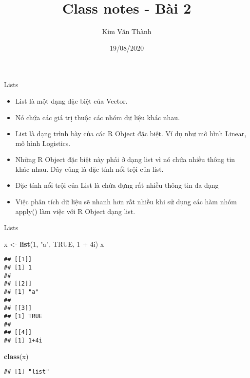 \documentclass[
  ignorenonframetext,
]{beamer}
\title{Class notes - Bài 2}
\author{Kim Văn Thành}
\date{19/08/2020}
\newenvironment{Shaded}{}{}
\newcommand{\DecValTok}[1]{\textcolor[rgb]{0.25,0.63,0.44}{#1}}
\newcommand{\KeywordTok}[1]{\textcolor[rgb]{0.00,0.44,0.13}{\textbf{#1}}}
\newcommand{\NormalTok}[1]{#1}
\newcommand{\OperatorTok}[1]{\textcolor[rgb]{0.40,0.40,0.40}{#1}}
\newcommand{\OtherTok}[1]{\textcolor[rgb]{0.00,0.44,0.13}{#1}}
\newcommand{\StringTok}[1]{\textcolor[rgb]{0.25,0.44,0.63}{#1}}
\begin{document}
\frame{\titlepage}

\begin{frame}{Lists}
\protect\hypertarget{lists}{}

\begin{itemize}[<+->]
\item
  List là một dạng đặc biệt của Vector.
\item
  Nó chứa các giá trị thuộc các nhóm dữ liệu khác nhau.
\item
  List là dạng trình bày của các R Object đặc biệt. Ví dụ như mô hình
  Linear, mô hình Logistics.
\item
  Những R Object đặc biệt này phải ở dạng list vì nó chứa nhiều thông
  tin khác nhau. Đây cũng là đặc tính nổi trội của list.
\item
  Đặc tính nổi trội của List là chứa đựng rất nhiều thông tin đa dạng
\item
  Việc phân tích dữ liệu sẽ nhanh hơn rất nhiều khi sử dụng các hàm nhóm
  apply() làm việc với R Object dạng list.
\end{itemize}

\end{frame}

\begin{frame}[fragile]{Lists}
\protect\hypertarget{lists-1}{}

\begin{Shaded}
\begin{Highlighting}[]
\NormalTok{x <-}\StringTok{ }\KeywordTok{list}\NormalTok{(}\DecValTok{1}\NormalTok{, }\StringTok{"a"}\NormalTok{, }\OtherTok{TRUE}\NormalTok{, }\DecValTok{1} \OperatorTok{+}\StringTok{ }\NormalTok{4i)}
\NormalTok{x}
\end{Highlighting}
\end{Shaded}

\begin{verbatim}
## [[1]]
## [1] 1
## 
## [[2]]
## [1] "a"
## 
## [[3]]
## [1] TRUE
## 
## [[4]]
## [1] 1+4i
\end{verbatim}

\begin{Shaded}
\begin{Highlighting}[]
\KeywordTok{class}\NormalTok{(x)}
\end{Highlighting}
\end{Shaded}

\begin{verbatim}
## [1] "list"
\end{verbatim}

\end{frame}
\end{document}
